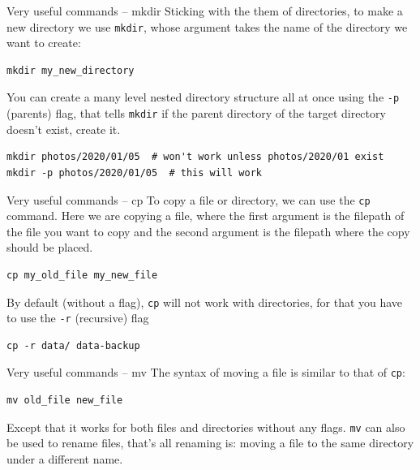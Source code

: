 \documentclass[10pt]{beamer}
\begin{document}
\begin{frame}[label={sec:orga7930d4},fragile]{Very useful commands -- mkdir}
 Sticking with the them of directories, to make a new directory we use \texttt{mkdir},
whose argument takes the name of the directory we want to create:

\begin{verbatim}
mkdir my_new_directory
\end{verbatim}

You can create a many level nested directory structure all at once using the \texttt{-p}
(parents) flag, that tells \texttt{mkdir} if the parent directory of the target directory
doesn't exist, create it.

\begin{verbatim}
mkdir photos/2020/01/05  # won't work unless photos/2020/01 exist
mkdir -p photos/2020/01/05  # this will work
\end{verbatim}
\end{frame}

\begin{frame}[label={sec:org277b798},fragile]{Very useful commands -- cp}
 To copy a file or directory, we can use the \texttt{cp} command. Here we are copying a
file, where the first argument is the filepath of the file you want to copy and the second
argument is the filepath where the copy should be placed.

\begin{verbatim}
cp my_old_file my_new_file
\end{verbatim}

By default (without a flag), \texttt{cp} will not work with directories, for that you
have to use the \texttt{-r} (recursive) flag

\begin{verbatim}
cp -r data/ data-backup
\end{verbatim}
\end{frame}

\begin{frame}[label={sec:org50609ba},fragile]{Very useful commands -- mv}
 The syntax of moving a file is similar to that of \texttt{cp}:

\begin{verbatim}
mv old_file new_file
\end{verbatim}

Except that it works for both files and directories without any flags. \texttt{mv} can
also be used to \alert{rename} files, that's all renaming is: moving a file to the same
directory under a different name.
\end{frame}
\end{document}
